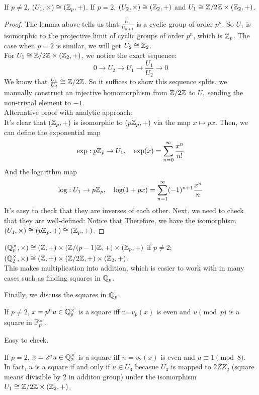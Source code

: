 \documentclass[15pt]{scrartcl}
\begin{document}
\begin{theorem}
    If $p\neq 2$, $(U_1, \times)\cong (\mathbb Z_p, +)$.
    If $p=2$, $(U_2, \times)\cong (\mathbb Z_2, +)$ and $U_1\cong \mathbb Z/2\mathbb Z \times (\mathbb Z_2, +)$.
\end{theorem}
\begin{proof}
The lemma above tells us that $\frac{U_1}{U_{n+1}}$ is a cyclic group of order $p^n$. So $U_1$ is isomorphic to the projective limit of cyclic groups of order $p^n$, which is $\mathbb Z_p$. The case when $p=2$ is similar, we will get $U_2\cong \mathbb Z_2$. 
\\

For $U_1\cong \mathbb Z/2\mathbb Z \times (\mathbb Z_2, +)$, we notice the exact sequence: 
\[0\to U_2 \to U_1 \to \frac{U_1}{U_2} \to 0\]
We know that $\frac{U_1}{U_2}\cong \mathbb Z/2\mathbb Z$. So it suffices to show this sequence splits. we manually construct an injective homomorphism from $\mathbb Z/2\mathbb Z$ to $U_1$ sending the non-trivial element to $-1$.
\\

Alternative proof with analytic approach:
\\

It's clear that $(\mathbb Z_p, +)$ is isomorphic to $(p\mathbb Z_p, +)$ via the map $x\mapsto px$. Then, we can define the exponential map
\[\exp: p\mathbb Z_p \to U_1, \quad \exp(x)=\sum_{n=0}^{\infty} \frac{x^n}{n!}\] 
And the logarithm map
\[\log: U_1 \to p\mathbb Z_p, \quad \log(1+px)=\sum_{n=1}^{\infty} (-1)^{n+1} \frac{x^n}{n}\]
It's easy to check that they are inverses of each other. Next, we need to check that they are well-defined: Notice that 
Therefore, we have the isomorphism $(U_1, \times)\cong (p\mathbb Z_p, +)\cong (\mathbb Z_p, +)$.
\end{proof}
\begin{theorem}
    $(\mathbb Q_p^{\times}, \times) \cong (\mathbb Z,+) \times (\mathbb Z/(p-1)\mathbb Z, +) \times (\mathbb Z_p,+)$ if $p\neq 2$;
    \\
    $(\mathbb Q_2^{\times}, \times) \cong (\mathbb Z,+) \times (\mathbb Z/2\mathbb Z, +) \times (\mathbb Z_2,+)$.
    \\
    This makes multiplication into addition, which is easier to work with in many cases such as finding squares in $\mathbb Q_p$.
\end{theorem}
Finally, we discuss the squares in $\mathbb Q_p$.
\begin{theorem}
    If $p\neq 2$, $x=p^nu\in \mathbb Q_p^{\times}$ is a square iff n=$v_p(x)$ is even and $u \pmod p$ is a square in $\mathbb F_p^{\times}$.
\end{theorem}
Easy to check. 
\begin{theorem}
    If $p=2$, $x=2^n u \in \mathbb Q_2^{\times}$ is a square iff $n=v_2(x)$ is even and $u\equiv 1 \pmod 8$. 
    \\
    
    In fact, $u$ is a square if and only if $u\in U_3$ becasue $U_3$ is mapped to $2ZZ_2$ (square means divisible by 2 in additon group) under the isomorphism $U_1\cong \mathbb Z/2\mathbb Z \times (\mathbb Z_2,+)$. 
\end{theorem}
\end{document}

